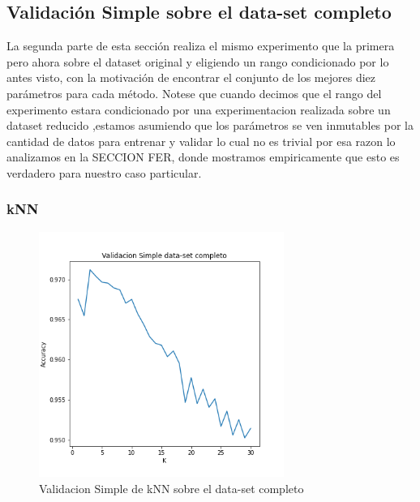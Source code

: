 \subsection{Validación Simple sobre el data-set completo}

La segunda parte de esta sección realiza el mismo experimento que la primera pero ahora sobre el dataset original y eligiendo un rango condicionado por lo antes visto, con la motivación de encontrar el conjunto de los mejores diez parámetros para cada método. Notese que cuando decimos que el rango del experimento estara condicionado por una experimentacion realizada sobre un dataset reducido ,estamos asumiendo que los parámetros se ven inmutables por la cantidad de datos para entrenar y validar lo cual no es trivial por esa razon lo analizamos en la SECCION FER, donde mostramos empiricamente que esto es verdadero para nuestro caso particular.


\subsubsection{kNN}


\begin{figure}[H]
    \centering
    \includegraphics[width=8cm]{images/validacionSimple_datasetCompleto.png}%
    \qquad
    \caption{Validacion Simple de kNN sobre el data-set completo}
    \label{knn_valSimple}%
\end{figure}

